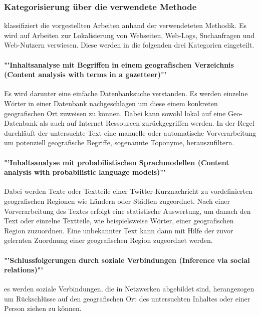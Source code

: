 		\subsubsection{Kategorisierung über die verwendete Methode}

		\cite{Cheng2010} klassifiziert die vorgestellten Arbeiten anhand der verwendeteten Methodik. 
		Es wird auf Arbeiten zur Lokalisierung von Webseiten, Web-Logs, Suchanfragen und Web-Nutzern verwiesen. 
		Diese werden in die folgenden drei Kategorien eingeteilt.

		\paragraph*{"'Inhaltsanalyse mit Begriffen in einem geografischen Verzeichnis (Content analysis with terms in a gazetteer)"'}  
		Es wird darunter eine einfache Datenbanksuche verstanden. 
		Es werden einzelne Wörter in einer Datenbank nachgeschlagen um diese einem konkreten geografischen Ort zuweisen zu können.
		Dabei kann sowohl lokal auf eine Geo-Datenbank als auch auf Internet Ressourcen zurückgegriffen werden.  
		In der Regel durchläuft der untersuchte Text eine manuelle oder automatische Vorverarbeitung um potenziell geografische Begriffe, sogenannte Toponyme, herauszufiltern. 

		\paragraph*{"'Inhaltsanalyse mit probabilistischen Sprachmodellen (Content analysis with probabilistic language models)"'}
		Dabei werden Texte oder Textteile einer Twitter-Kurznachricht zu vordefinierten geografischen Regionen wie Ländern oder Städten zugeordnet. 
		Nach einer Vorverarbeitung des Textes erfolgt eine statistische Auswertung, um danach den Text oder einzelne Textteile, wie beispielsweise Wörter, einer geografischen Region zuzuordnen. 
		Eine unbekannter Text kann dann mit Hilfe der zuvor gelernten Zuordnung einer geografischen Region zugeordnet werden.

		\paragraph*{"'Schlussfolgerungen durch soziale Verbindungen (Inference via social relations)"'} es werden soziale Verbindungen, die in Netzwerken abgebildet sind, herangezogen um Rückschlüsse auf den geografischen Ort des untersuchten Inhaltes oder einer Person ziehen zu können.

